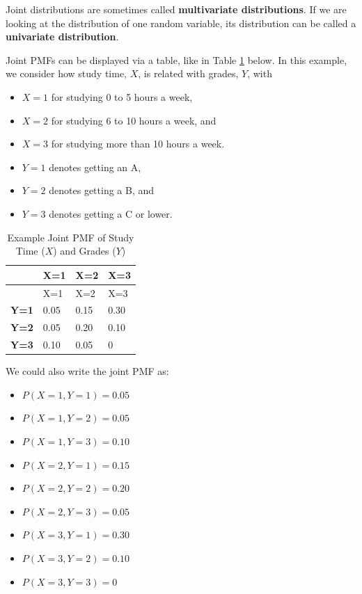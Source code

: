 \documentclass[
]{book}
\providecommand{\tightlist}{%
  \setlength{\itemsep}{0pt}\setlength{\parskip}{0pt}}
\begin{document}
Joint distributions are sometimes called \textbf{multivariate distributions}. If we are looking at the distribution of one random variable, its distribution can be called a \textbf{univariate distribution}.

Joint PMFs can be displayed via a table, like in Table \ref{tab:simple-table} below. In this example, we consider how study time, \(X\), is related with grades, \(Y\), with

\begin{itemize}
\tightlist
\item
  \(X=1\) for studying 0 to 5 hours a week,
\item
  \(X=2\) for studying 6 to 10 hours a week, and
\item
  \(X=3\) for studying more than 10 hours a week.
\item
  \(Y=1\) denotes getting an A,
\item
  \(Y=2\) denotes getting a B, and
\item
  \(Y=3\) denotes getting a C or lower.
\end{itemize}

\begin{longtable}[]{@{}llll@{}}
\caption{\label{tab:simple-table} Example Joint PMF of Study Time (\(X\)) and Grades (\(Y\))}\tabularnewline
\toprule\noalign{}
& X=1 & X=2 & X=3 \\
\midrule\noalign{}
\endfirsthead
\toprule\noalign{}
& X=1 & X=2 & X=3 \\
\midrule\noalign{}
\endhead
\bottomrule\noalign{}
\endlastfoot
\textbf{Y=1} & 0.05 & 0.15 & 0.30 \\
\textbf{Y=2} & 0.05 & 0.20 & 0.10 \\
\textbf{Y=3} & 0.10 & 0.05 & 0 \\
\end{longtable}

We could also write the joint PMF as:

\begin{itemize}
\tightlist
\item
  \(P(X=1, Y=1) = 0.05\)
\item
  \(P(X=1, Y=2) = 0.05\)
\item
  \(P(X=1, Y=3) = 0.10\)
\item
  \(P(X=2, Y=1) = 0.15\)
\item
  \(P(X=2, Y=2) = 0.20\)
\item
  \(P(X=2, Y=3) = 0.05\)
\item
  \(P(X=3, Y=1) = 0.30\)
\item
  \(P(X=3, Y=2) = 0.10\)
\item
  \(P(X=3, Y=3) = 0\)
\end{itemize}
\end{document}
